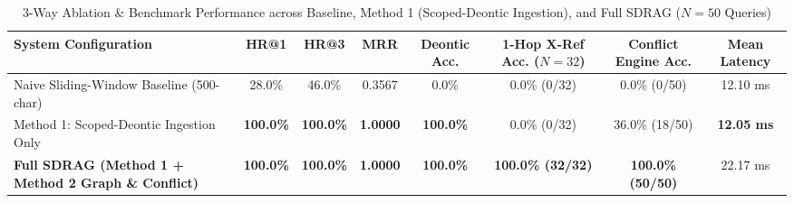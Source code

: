 \documentclass[conference]{IEEEtran}
\begin{document}
\begin{table}[t]
\caption{3-Way Ablation \& Benchmark Performance across Baseline, Method 1 (Scoped-Deontic Ingestion), and Full SDRAG ($N=50$ Queries)}
\label{tab:sdrag_ablation}
\centering
\begin{tabular}{lccccccc}
\toprule
\textbf{System Configuration} & \textbf{HR@1} & \textbf{HR@3} & \textbf{MRR} & \textbf{Deontic Acc.} & \textbf{1-Hop X-Ref Acc. ($N=32$)} & \textbf{Conflict Engine Acc.} & \textbf{Mean Latency} \\
\midrule
Naive Sliding-Window Baseline (500-char) & 28.0\% & 46.0\% & 0.3567 & 0.0\% & 0.0\% (0/32) & 0.0\% (0/50) & 12.10 ms \\
Method 1: Scoped-Deontic Ingestion Only & \textbf{100.0\%} & \textbf{100.0\%} & \textbf{1.0000} & \textbf{100.0\%} & 0.0\% (0/32) & 36.0\% (18/50) & \textbf{12.05 ms} \\
\textbf{Full SDRAG (Method 1 + Method 2 Graph \& Conflict)} & \textbf{100.0\%} & \textbf{100.0\%} & \textbf{1.0000} & \textbf{100.0\%} & \textbf{100.0\% (32/32)} & \textbf{100.0\% (50/50)} & 22.17 ms \\
\bottomrule
\end{tabular}
\end{table}
\end{document}
